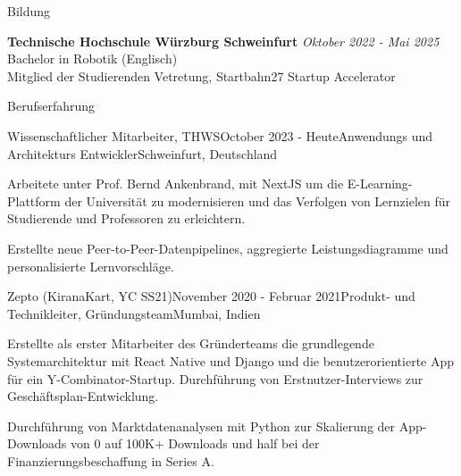 \documentclass[
	a4paper, %
	10pt, %
]{resume} %
\begin{document}

\begin{rSection}{Bildung}

	\textbf{Technische Hochschule Würzburg Schweinfurt} \hfill \textit{Oktober 2022 - Mai 2025} \\
	Bachelor in Robotik (Englisch) \\
	Mitglied der Studierenden Vetretung, Startbahn27 Startup Accelerator \\

\end{rSection}


\begin{rSection}{Berufserfahrung}

	\begin{rSubsection}{Wissenschaftlicher Mitarbeiter, THWS}{October 2023 - Heute}{Anwendungs und Architekturs Entwickler}{Schweinfurt, Deutschland}
		\item Arbeitete unter Prof. Bernd Ankenbrand, mit NextJS um die E-Learning-Plattform der Universität zu modernisieren und das Verfolgen von Lernzielen für Studierende und Professoren zu erleichtern.
		\item Erstellte neue Peer-to-Peer-Datenpipelines, aggregierte Leistungsdiagramme und personalisierte Lernvorschläge.
	\end{rSubsection}


	\begin{rSubsection}{Zepto (KiranaKart, YC SS21)}{November 2020 - Februar 2021}{Produkt- und Technikleiter, Gründungsteam}{Mumbai, Indien}
		\item Erstellte als erster Mitarbeiter des Gründerteams die grundlegende Systemarchitektur mit React Native und Django und die benutzerorientierte App für ein Y-Combinator-Startup. Durchführung von Erstnutzer-Interviews zur Geschäftsplan-Entwicklung.
		\item Durchführung von Marktdatenanalysen mit Python zur Skalierung der App-Downloads von 0 auf 100K+ Downloads und half bei der Finanzierungsbeschaffung in Series A.

	\end{rSubsection}

\end{rSection}
\end{document}
